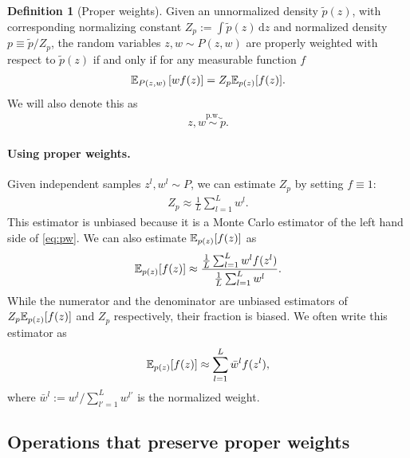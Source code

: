 \documentclass{article}
\theoremstyle{definition}
\newtheorem{definition}{Definition}
\newcommand{\pw}{\overset{\text{p.w.}}{\sim}
}
\begin{document}
\begin{definition}[Proper weights]
    Given an unnormalized density $\tilde p(z)$, with corresponding normalizing constant $Z_p := \int \tilde p(z) \,\mathrm dz$ and normalized density $p \equiv \tilde p / Z_p$, the random variables $z, w \sim P(z, w)$ are properly weighted with respect to $\tilde p(z)$ if and only if for any measurable function $f$
    \begin{align}
    \label{eq:pw}
    \mathbb{E}_{P(z, w)}\left[w f(z)\right] = Z_p \mathbb{E}_{p(z)}[f(z)]. 
    \end{align}
    We will also denote this as
    \begin{align*}
        z, w \pw \tilde p.
    \end{align*}
\end{definition}

\paragraph{Using proper weights.}
Given independent samples $z^l, w^l \sim P$, we can estimate $Z_p$ by setting $f \equiv 1$:
\begin{align*}
    Z_p \approx \frac{1}{L} \sum_{l = 1}^L w^l.
\end{align*}
This estimator is unbiased because it is a Monte Carlo estimator of the left hand side of \eqref{eq:pw}.
We can also estimate $\mathbb{E}_{p(z)}[f(z)]$ as
\begin{align*}
    \mathbb{E}_{p(z)}[f(z)] \approx \frac{\frac{1}{L} \sum_{l = 1}^L w^l f(z^l)}{\frac{1}{L} \sum_{l = 1}^L w^l}.
\end{align*}
While the numerator and the denominator are unbiased estimators of $Z_p \mathbb{E}_{p(z)}[f(z)]$ and $Z_p$ respectively, their fraction is biased.
We often write this estimator as
\begin{align}
    \mathbb{E}_{p(z)}[f(z)] \approx \sum_{l = 1}^L \bar w^l f(z^l), \label{eq:pw-estimation}
\end{align}
where $\bar w^l := w^l / \sum_{l' = 1}^L w^{l'}$ is the normalized weight.

\subsection{Operations that preserve proper weights}
\end{document}
